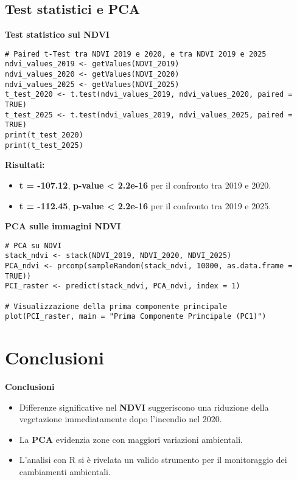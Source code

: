 \documentclass{beamer}
\begin{document}
\subsection{Test statistici e PCA}

\begin{frame}[fragile]{\textbf{Test statistico sul NDVI}}
\begin{lstlisting}
# Paired t-Test tra NDVI 2019 e 2020, e tra NDVI 2019 e 2025
ndvi_values_2019 <- getValues(NDVI_2019)
ndvi_values_2020 <- getValues(NDVI_2020)
ndvi_values_2025 <- getValues(NDVI_2025)
t_test_2020 <- t.test(ndvi_values_2019, ndvi_values_2020, paired = TRUE)
t_test_2025 <- t.test(ndvi_values_2019, ndvi_values_2025, paired = TRUE)
print(t_test_2020)
print(t_test_2025)
\end{lstlisting}
\textbf{Risultati:}
\begin{itemize}
    \item \textbf{t = -107.12}, \textbf{p-value < 2.2e-16} per il confronto tra 2019 e 2020.
    \item \textbf{t = -112.45}, \textbf{p-value < 2.2e-16} per il confronto tra 2019 e 2025.
\end{itemize}
\end{frame}

\begin{frame}[fragile]{\textbf{PCA sulle immagini NDVI}}
\begin{lstlisting}
# PCA su NDVI
stack_ndvi <- stack(NDVI_2019, NDVI_2020, NDVI_2025)
PCA_ndvi <- prcomp(sampleRandom(stack_ndvi, 10000, as.data.frame = TRUE))
PCI_raster <- predict(stack_ndvi, PCA_ndvi, index = 1)

# Visualizzazione della prima componente principale
plot(PCI_raster, main = "Prima Componente Principale (PC1)")
\end{lstlisting}
\end{frame}

\section{Conclusioni}

\begin{frame}{\textbf{Conclusioni}}
\begin{itemize}
    \item Differenze significative nel \textbf{NDVI} suggeriscono una riduzione della vegetazione immediatamente dopo l'incendio nel 2020.
    \item La \textbf{PCA} evidenzia zone con maggiori variazioni ambientali.
    \item L'analisi con R si è rivelata un valido strumento per il monitoraggio dei cambiamenti ambientali.
\end{itemize}
\end{frame}
\end{document}

